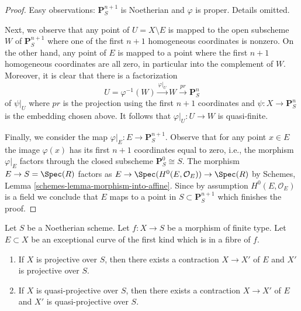 \begin{proof}
\medskip\noindent
Easy observations: $\mathbf{P}^{n + 1}_S$ is Noetherian and $\varphi$ is proper.
Details omitted.

\medskip\noindent
Next, we observe that any point of $U = X \setminus E$ is mapped
to the open subscheme $W$ of $\mathbf{P}^{n + 1}_S$ where one of the
first $n + 1$ homogeneous coordinates is nonzero. On the other hand,
any point of $E$ is mapped to a point where the first $n + 1$ homogeneous
coordinates are all zero, in particular into the complement of $W$.
Moreover, it is clear that there is a factorization
$$
U = \varphi^{-1}(W) \xrightarrow{\varphi|_U} W \xrightarrow{pr} \mathbf{P}^n_S
$$
of $\psi|_U$ where $pr$ is the projection using the first
$n + 1$ coordinates and $\psi : X \to \mathbf{P}^n_S$ is the embedding chosen
above. It follows that $\varphi|_U : U \to W$ is quasi-finite.

\medskip\noindent
Finally, we consider the map $\varphi|_E : E \to \mathbf{P}^{n + 1}_S$.
Observe that for any point $x \in E$ the image $\varphi(x)$
has its first $n + 1$ coordinates equal to zero, i.e., the morphism
$\varphi|_E$ factors through the closed subscheme
$\mathbf{P}^0_S \cong S$. The morphism $E \to S = \Spec(R)$
factors as $E \to \Spec(H^0(E, \mathcal{O}_E)) \to \Spec(R)$
by Schemes, Lemma \ref{schemes-lemma-morphism-into-affine}.
Since by assumption $H^0(E, \mathcal{O}_E)$ is a field we conclude
that $E$ maps to a point in $S \subset \mathbf{P}^{n + 1}_S$
which finishes the proof.
\end{proof}

\begin{lemma}
\label{lemma-contract-when-quasi-projective}
Let $S$ be a Noetherian scheme. Let $f : X \to S$ be a morphism of finite type.
Let $E \subset X$ be an exceptional curve of the first kind which is in a
fibre of $f$.
\begin{enumerate}
\item If $X$ is projective over $S$, then there exists a contraction
$X \to X'$ of $E$ and $X'$ is projective over $S$.
\item If $X$ is quasi-projective over $S$, then there exists a contraction
$X \to X'$ of $E$ and $X'$ is quasi-projective over $S$.
\end{enumerate}
\end{lemma}

